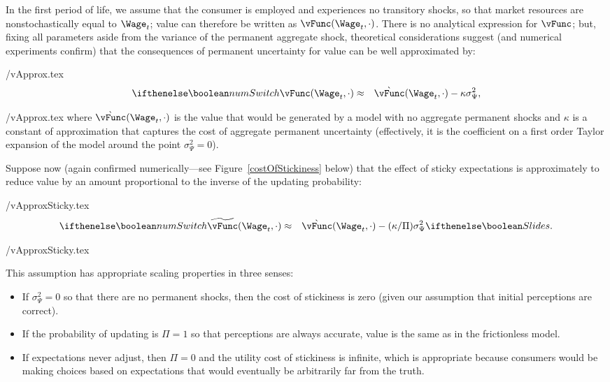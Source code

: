 \documentclass[titlepage]{\econtex}\newcommand{\texname}{cAndCwithStickyE}
\begin{document}
In the first period of life, we assume that the consumer is employed and experiences no transitory shocks, so that market resources are nonstochastically equal to $\Wage_t$; value can therefore be written as $\vFunc(\Wage_t,\cdot)$.  There is no analytical expression for $\vFunc$; but, fixing all parameters aside from the variance of the permanent aggregate shock, theoretical considerations suggest (and numerical experiments confirm) that the consequences of permanent uncertainty for value can be well approximated by:
\begin{verbatimwrite}{\eq/vApprox.tex}
\begin{eqnarray}
\ifnumSw  \vFunc(\Wage_t,\cdot) & \approx & \grave{\vFunc}(\Wage_t,\cdot) - \kappa \sigma^{2}_{\Psi}, \label{eq:vApprox}
\end{eqnarray}
\end{verbatimwrite}
 {\eq/vApprox.tex} where $\grave{\vFunc}(\Wage_t,\cdot)$ is the value that would be generated by a model with no aggregate permanent shocks and $\kappa$ is a constant of approximation that captures the cost of aggregate permanent uncertainty (effectively, it is the coefficient on a first order Taylor expansion of the model around the point $\sigma_{\Psi}^{2}=0$).

Suppose now (again confirmed numerically---see Figure~\ref{costOfStickiness} below) that the effect of sticky expectations is approximately to reduce value by an amount proportional to the inverse of the updating probability:
\begin{verbatimwrite}{\eq/vApproxSticky.tex}
\begin{eqnarray}
  \label{eq:vBar}
\ifnumSw  \perc{\vFunc}(\Wage_t,\cdot) & \approx & \grave{\vFunc}(\Wage_t,\cdot)-(\kappa/\Pi)\sigma^{2}_{\Psi} \label{eq:vApproxSticky}
\ifslides{}{.}
\end{eqnarray}
\end{verbatimwrite}
 \eq/vApproxSticky.tex

This assumption has appropriate scaling properties in three senses:
\begin{itemize}
\item If $\sigma^{2}_{\Psi}=0$ so that there are no permanent shocks, then
the cost of stickiness is zero (given our assumption that initial perceptions are correct).
\item If the probability of updating is $\Pi=1$ so that perceptions
are always accurate, value is the same as in the frictionless model.
\item If expectations never adjust, then $\Pi=0$ and the utility cost of stickiness is infinite,
which is appropriate because consumers would be making choices based on
expectations that would eventually be arbitrarily far from the truth.
\end{itemize}
\end{document}
